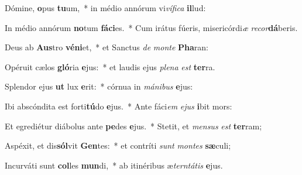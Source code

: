 \item Dómine, \textbf{o}pus \textbf{tu}um,~* in médio annórum vi\textit{ví}\textit{fi}\textit{ca} \textbf{il}lud:
\item In médio annórum \textbf{no}tum \textbf{fá}\textbf{ci}es.~* Cum irátus fúeris, misericórdi\textit{æ} \textit{re}\textit{cor}\textbf{dá}beris.
\item Deus ab \textbf{Aus}tro \textbf{vé}\textbf{ni}et,~* et Sanctus \textit{de} \textit{mon}\textit{te} \textbf{Pha}ran:
\item Opéruit cælos \textbf{gló}ria \textbf{e}jus:~* et laudis ejus \textit{ple}\textit{na} \textit{est} \textbf{ter}ra.
\item Splendor ejus \textbf{ut} lux \textbf{e}rit:~* córnua in \textit{má}\textit{ni}\textit{bus} \textbf{e}jus:
\item Ibi abscóndita est forti\textbf{tú}do \textbf{e}jus.~* Ante fáci\textit{em} \textit{e}\textit{jus} \textbf{i}bit mors:
\item Et egrediétur diábolus ante \textbf{pe}des \textbf{e}jus.~* Stetit, et \textit{men}\textit{sus} \textit{est} \textbf{ter}ram;
\item Aspéxit, et dis\textbf{sól}vit \textbf{Gen}tes:~* et contríti \textit{sunt} \textit{mon}\textit{tes} \textbf{sæ}culi;
\item Incurváti sunt \textbf{col}les \textbf{mun}di,~* ab itinéribus æ\textit{tern}\textit{tá}\textit{tis} \textbf{e}jus.
